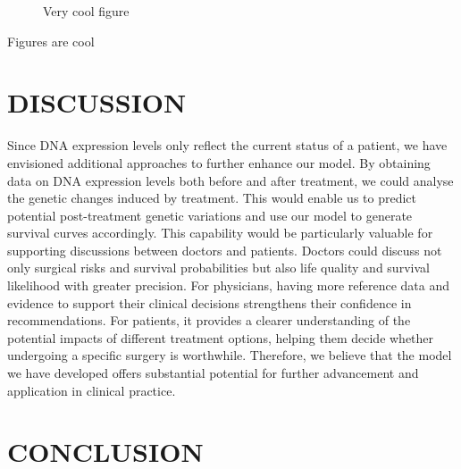 \documentclass[conference]{ieeeconf}
\begin{document}
   \begin{figure}[thpb]
      \centering
      \caption{Very cool figure}
      \label{figurelabel}
   \end{figure}
   

Figures are cool


\section{DISCUSSION}

Since DNA expression levels only reflect the current status of a patient, we have envisioned additional approaches to further enhance our model. By obtaining data on DNA expression levels both before and after treatment, we could analyse the genetic changes induced by treatment. This would enable us to predict potential post-treatment genetic variations and use our model to generate survival curves accordingly. 
This capability would be particularly valuable for supporting discussions between doctors and patients. Doctors could discuss not only surgical risks and survival probabilities but also life quality and survival likelihood with greater precision. For physicians, having more reference data and evidence to support their clinical decisions strengthens their confidence in recommendations. For patients, it provides a clearer understanding of the potential impacts of different treatment options, helping them decide whether undergoing a specific surgery is worthwhile.
Therefore, we believe that the model we have developed offers substantial potential for further advancement and application in clinical practice. 


\section{CONCLUSION}
\end{document}
